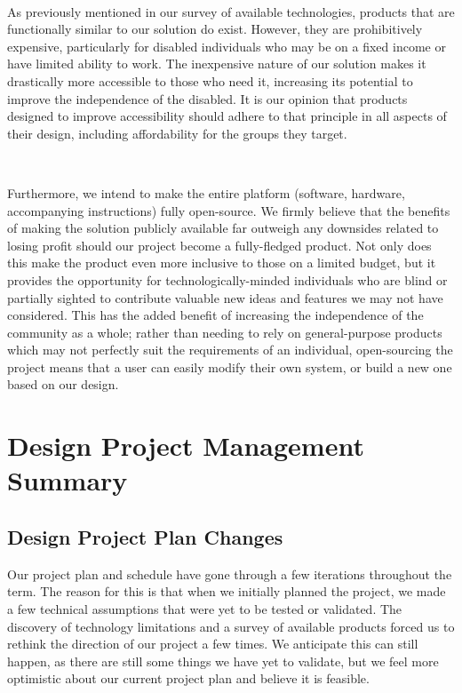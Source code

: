 \documentclass[a4paper,11pt]{article}
\begin{document}
\

\noindent
As previously mentioned in our survey of available technologies, products that are functionally similar to our solution do exist. However, they are prohibitively expensive, particularly for disabled individuals who may be on a fixed income or have limited ability to work. The inexpensive nature of our solution makes it drastically more accessible to those who need it, increasing its potential to improve the independence of the disabled. It is our opinion that products designed to improve accessibility should adhere to that principle in all aspects of their design, including affordability for the groups they target.

\

\noindent
Furthermore, we intend to make the entire platform (software, hardware, accompanying instructions) fully open-source. We firmly believe that the benefits of making the solution publicly available far outweigh any downsides related to losing profit should our project become a fully-fledged product. Not only does this make the product even more inclusive to those on a limited budget, but it provides the opportunity for technologically-minded individuals who are blind or partially sighted to contribute valuable new ideas and features we may not have considered. This has the added benefit of increasing the independence of the community as a whole; rather than needing to rely on general-purpose products which may not perfectly suit the requirements of an individual, open-sourcing the project means that a user can easily modify their own system, or build a new one based on our design.

\newpage
\section{Design Project Management Summary}
\subsection{Design Project Plan Changes}
Our project plan and schedule have gone through a few iterations throughout the term. The reason for this is that when we initially planned the project, we made a few technical assumptions that were yet to be tested or validated. The discovery of technology limitations and a survey of available products forced us to rethink the direction of our project a few times. We anticipate this can still happen, as there are still some things we have yet to validate, but we feel more optimistic about our current project plan and believe it is feasible.
\end{document}
